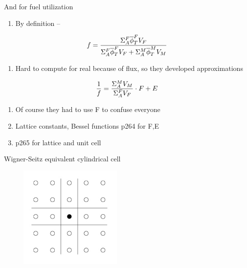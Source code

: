 \documentclass[aspectratio=1610,pdftex,dvipsnames,compress,xcolor={dvipsnames}]{beamer}
\begin{document}
\begin{frame}{And for fuel utilization}
    \begin{enumerate}[series=outerlist,topsep=0pt,itemsep=21pt,leftmargin=*,label=(\arabic*)]
        \item[]By definition --
    \end{enumerate}

    \vspace*{\fill}

    \begin{equation}
        \LARGE
        f = \frac{\Sigma_A^F \overline{\phi}_T^F V_F}{\Sigma_A^F \overline{\phi}_T^F V_F + \Sigma_A^M \overline{\phi}_T^M V_M}
    \end{equation}

    \vspace*{\fill}

    \begin{enumerate}[series=outerlist,topsep=0pt,itemsep=21pt,leftmargin=*,label=(\arabic*)]
        \item[]Hard to compute for real because of flux, so they developed approximations
    \end{enumerate}

    \vspace*{\fill}

    \begin{equation}
        \LARGE
        \frac{1}{f} = \frac{\Sigma_A^M V_M}{\Sigma_A^F V_F} \cdot F + E
    \end{equation}

    \vspace*{\fill}

    \begin{enumerate}[series=outerlist,topsep=0pt,itemsep=21pt,leftmargin=*,label=(\arabic*)]
        \item[]Of course they had to use F to confuse everyone
        \item[]Lattice constants, Bessel functions p264 for F,E
        \item[]p265 for lattice and unit cell
    \end{enumerate}
\end{frame}


\begin{frame}{Wigner-Seitz equivalent cylindrical cell}
    \begin{figure}
        \centering
        \includegraphics[width=0.45\textwidth]{lattice.unit.cell.jpg}
    \end{figure}
\end{frame}
\end{document}
